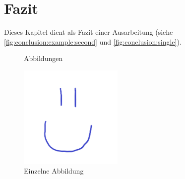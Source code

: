 \chapter{Fazit}
\label{ch:conclusion}
Dieses Kapitel dient als Fazit einer Ausarbeitung (siehe \autoref{fig:conclusion:example:second} und \autoref{fig:conclusion:single}).

\begin{figure}[H]%
	\centering%
	\qquad%
	\caption{Abbildungen}%
	\label{fig:conclusion:example}%
\end{figure}

\begin{figure}%
	\centering%
	\includegraphics[height=5cm,keepaspectratio]{./fig/example.png}%
	\caption{Einzelne Abbildung}%
	\label{fig:conclusion:single}%
\end{figure}

